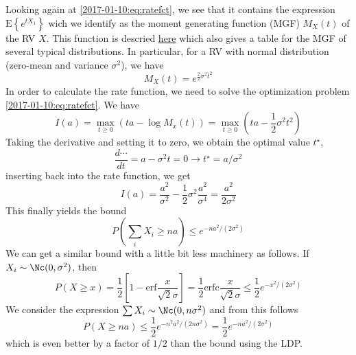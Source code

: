 

Looking again at \eqref{2017-01-10:eq:ratefct}, we see that it contains the expression $\mathrm{E}\left\{ e^{t X_1}\right\}$ wich we identify as the moment generating function (MGF) $M_X(t)$ of the RV $X$.
%
%
This function is descried \href{https://en.wikipedia.org/wiki/Moment-generating_function}{here} which also gives a table for the MGF of several typical distributions. In particular, for a RV with normal distribution (zero-mean and variance $\sigma^2$), we have
%
\begin{equation*}
M_X(t) = e^{\frac{2}{2}\sigma^2 t^2}
\end{equation*}
%
In order to calculate the rate function, we need to solve the optimization problem \eqref{2017-01-10:eq:ratefct}. We have
%
\begin{equation*}
I(a) = \max_{t \geq 0} \left( ta - \log M_x(t) \right) = \max_{t \geq 0} \left( ta - \frac{1}{2} \sigma^2 t^2 \right)
\end{equation*}
%
Taking the derivative and setting it to zero, we obtain the optimal value $t^\star$,
%
\begin{equation*}
  \frac{d \cdots}{dt} = a - \sigma^2 t = 0 \rightarrow t^\star = a / \sigma^2
\end{equation*}
%
inserting back into the rate function, we get
%
\begin{equation*}
I(a) = \frac{a^2}{\sigma^2} - \frac{1}{2} \sigma^2 \frac{a^2}{\sigma^4} = \frac{a^2}{2\sigma^2}
\end{equation*}
%
This finally yields the bound
%
\begin{equation*}
  P\left( \sum_i X_i \geq na \right) \leq e^{-n a^2 / (2\sigma^2)}
\end{equation*}
%
%
We can get a similar bound with a little bit less machinery as follows. If $X_i \sim \Nc(0,\sigma^2)$, then
%
\begin{equation*}
  P(X \geq x)=\frac{1}{2} \left[ 1 - \mathrm{erf} \frac{x}{\sqrt{2}\sigma}\right] = \frac{1}{2} \mathrm{erfc} \frac{x}{\sqrt{2}\sigma} \leq \frac{1}{2} e^{-x^2 / (2\sigma^2)}
\end{equation*}
%
We consider the expression $\sum X_i \sim \Nc (0, n \sigma^2)$ and from this follows
%
\begin{equation*}
    P(X \geq na) \leq \frac{1}{2} e^{-n^2 a^2 / (2 n \sigma^2)} = \frac{1}{2} e^{-n a^2 / (2 \sigma^2)}
  \end{equation*}
%
which is even better by a factor of $1/2$ than the bound using the LDP.